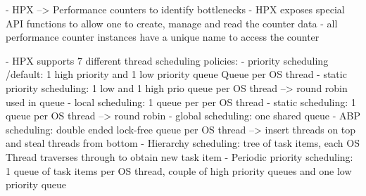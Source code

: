   \cite{TheSTEARGroup.2020}
    - HPX --> Performance counters to identify bottlenecks
    - HPX exposes special API functions to allow one to create, manage and read the counter data
    - all performance counter instances have a unique name to access the counter


  \cite{hpxMP.2019}
  \cite{TheSTEARGroup.2020}
    - HPX supports 7 different thread scheduling policies:
      - priority scheduling /default: 1 high priority and 1 low priority queue Queue per OS thread
      - static priority scheduling: 1 low and 1 high prio queue per OS thread --> round robin used in queue
      - local scheduling: 1 queue per per OS thread
      - static scheduling: 1 queue per OS thread --> round robin
      - global scheduling: one shared queue
      - ABP scheduling: double ended lock-free queue per OS thread --> insert threads on top and steal threads from bottom
      - Hierarchy scheduling: tree of task items, each OS Thread traverses through to obtain new task item
      - Periodic priority scheduling: 1 queue of task items per OS thread, couple of high priority queues and one low priority queue
      